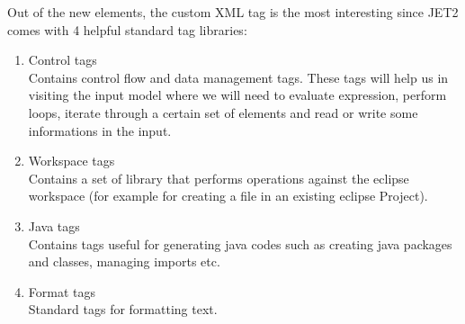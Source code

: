Out of the new elements, the custom XML tag is the most interesting since JET2 comes with 4 helpful standard tag libraries\cite{JET2TAGS}:
\begin{enumerate}
	\item Control tags\\
		    Contains control flow and data management tags. These tags will help us in visiting the input model where we will need to evaluate expression, perform loops,  iterate through a certain set of elements and read or write some informations in the input. 
	\item Workspace tags\\
			  Contains a set of library that performs operations against the eclipse workspace (for example for creating a file in an existing eclipse Project). 
	\item Java tags\\
				Contains tags useful for generating java codes such as creating java packages and classes, managing imports etc.
	\item Format tags\\
		    Standard tags for formatting text. 
\end{enumerate}

